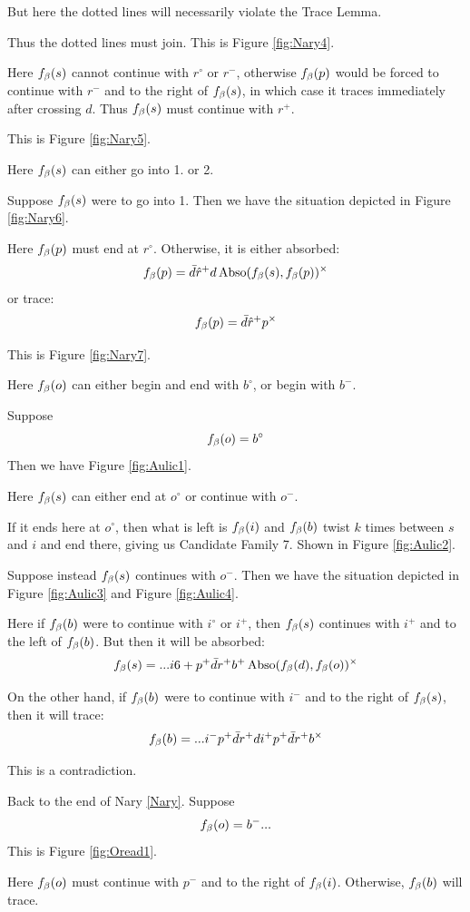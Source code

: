 But here the dotted lines will necessarily violate the Trace Lemma.

Thus the dotted lines must join. This is Figure \ref{fig:Nary4}.

Here $f_\beta(s)$ cannot continue with $r^\circ$ or $r^-$, otherwise $f_\beta(p)$ would be forced to continue with $r^-$ and to the right of $f_\beta(s)$, in which case it traces immediately after crossing $d$. Thus $f_\beta(s)$ must continue with $r^+$.

This is Figure \ref{fig:Nary5}.

Here $f_\beta(s)$ can either go into 1. or 2.

Suppose $f_\beta(s)$ were to go into 1. Then we have the situation depicted in Figure \ref{fig:Nary6}.

Here $f_\beta(p)$ must end at $r^\circ$. Otherwise, it is either absorbed:
\[
f_\beta(p) = \bar{d} \hat{r}^+ d \operatorname{Abso}(f_\beta(s), f_\beta(p))^\times
\]
or trace:
\[
f_\beta(p) = \bar{d} \hat{r}^+ p^\times
\]

This is Figure \ref{fig:Nary7}.

Here $f_\beta(o)$ can either begin and end with $b^\circ$, or begin with $b^-$.

\label{Aulic}
Suppose
\[
f_\beta(o) = b^\circ
\]
Then we have Figure \ref{fig:Aulic1}.

Here $f_\beta(s)$ can either end at $o^\circ$ or continue with $o^-$.

If it ends here at $o^\circ$, then what is left is $f_\beta(i)$ and $f_\beta(b)$ twist $k$ times between $s$ and $i$ and end there, giving us Candidate Family 7. Shown in Figure \ref{fig:Aulic2}.

Suppose instead $f_\beta(s)$ continues with $o^-$. Then we have the situation depicted in Figure \ref{fig:Aulic3} and Figure \ref{fig:Aulic4}.

Here if $f_\beta(b)$ were to continue with $i^\circ$ or $i^+$, then $f_\beta(s)$ continues with $i^+$ and to the left of $f_\beta(b)$. But then it will be absorbed:
\[
f_\beta(s) =...i6+ p^+ \bar{d} r^+ b^+ \operatorname{Abso}(f_\beta(d), f_\beta(o))^\times
\]

On the other hand, if $f_\beta(b)$ were to continue with $i^-$ and to the right of $f_\beta(s)$, then it will trace:
\[
f_\beta(b) = ...i^- p^+ \bar{d} r^+ d i^+ p^+ \bar{d} r^+ b^\times
\]

This is a contradiction.

\label{Oread}
Back to the end of Nary \ref{Nary}. Suppose
\[
f_\beta(o) = b^-...
\]
This is Figure \ref{fig:Oread1}.

Here $f_\beta(o)$ must continue with $p^-$ and to the right of $f_\beta(i)$. Otherwise, $f_\beta(b)$ will trace.

